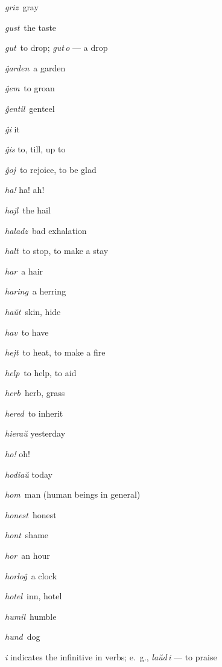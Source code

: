 \begin{landscape}
\begin{multicols}{5}
\begin{outdent}{1em}
\emph{griz\,} gray

\emph{gust\,} the taste

\emph{gut\,} to drop; \emph{gut\,o} — a drop
\end{outdent}


\begin{outdent}{1em}
\emph{ĝarden\,} a garden

\emph{ĝem\,} to groan

\emph{ĝentil\,} genteel

\emph{ĝi} it

\emph{ĝis} to, till, up to

\emph{ĝoj\,} to rejoice, to be glad
\end{outdent}


\begin{outdent}{1em}
\emph{ha!} ha! ah!

\emph{hajl\,} the hail

\emph{haladz\,} bad exhalation

\emph{halt\,} to stop, to make a stay

\emph{har\,} a hair

\emph{haring\,} a herring

\emph{haŭt\,} skin, hide

\emph{hav\,} to have

\emph{hejt\,} to heat, to make a fire

\emph{help\,} to help, to aid

\emph{herb\,} herb, grass

\emph{hered\,} to inherit

\emph{hieraŭ} yesterday

\emph{ho!} oh!

\emph{hodiaŭ} today

\emph{hom\,} man (human beings in general)

\emph{honest\,} honest

\emph{hont\,} shame

\emph{hor\,} an hour

\emph{horloĝ\,} a clock

\emph{hotel\,} inn, hotel

\emph{humil\,} humble

\emph{hund\,} dog
\end{outdent}


\begin{outdent}{1em}
\emph{i} indicates the infinitive in verbs; e.~g., \emph{laŭd\,i} — to praise


\end{outdent}
\end{multicols}
\end{landscape}
